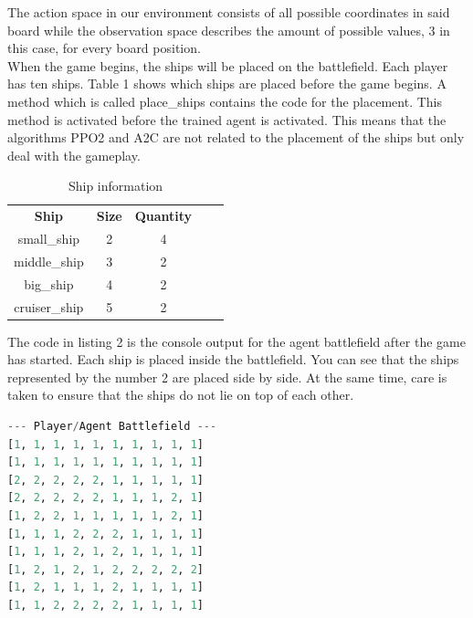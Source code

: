 \documentclass[sigconf]{acmart}
\begin{document}
The action space in our environment consists of all possible coordinates in said board while the observation space describes the amount of possible values, 3 in this case, for every board position.\\

\newline
When the game begins, the ships will be placed on the battlefield.
Each player has ten ships. Table 1 shows which ships are placed before the game begins. A method which is called place\_ships contains the code for the placement. This method is activated before the trained agent is activated. This means that the algorithms PPO2 and A2C are not related to the placement of the ships but only deal with the gameplay.

\begin{table}[htb]
\vspace{2.5mm}
\begin{tabular}{|c|c|c|ll}
\cline{1-3}
\textbf{Ship} & \textbf{Size} & \textbf{Quantity} \\ \cline{1-3}
small\_ship   & 2    & 4        \\ \cline{1-3}
middle\_ship  & 3    & 2        \\ \cline{1-3}
big\_ship     & 4    & 2        \\ \cline{1-3}
cruiser\_ship & 5    & 2        \\ \cline{1-3}
\end{tabular}
\vspace{2.5mm}
\caption{\label{tab:table-name}Ship information}
\end{table}

The code in listing 2 is the console output for the agent battlefield after the game has started. 
Each ship is placed inside the battlefield. You can see that the ships represented by the number 2 are placed side by side. At the same time, care is taken to ensure that the ships do not lie on top of each other.\\

\begin{lstlisting}[language=Python, caption=Battlefield in start condition]
--- Player/Agent Battlefield ---
[1, 1, 1, 1, 1, 1, 1, 1, 1, 1]
[1, 1, 1, 1, 1, 1, 1, 1, 1, 1]
[2, 2, 2, 2, 2, 1, 1, 1, 1, 1]
[2, 2, 2, 2, 2, 1, 1, 1, 2, 1]
[1, 2, 2, 1, 1, 1, 1, 1, 2, 1]
[1, 1, 1, 2, 2, 2, 1, 1, 1, 1]
[1, 1, 1, 2, 1, 2, 1, 1, 1, 1]
[1, 2, 1, 2, 1, 2, 2, 2, 2, 2]
[1, 2, 1, 1, 1, 2, 1, 1, 1, 1]
[1, 1, 2, 2, 2, 2, 1, 1, 1, 1]
\end{lstlisting}
\end{document}

